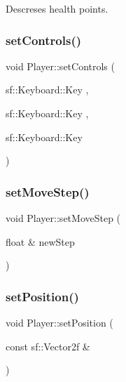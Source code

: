 Descreses health points. 

\mbox{\label{class_player_ab9820af1d231f97e0499b70ed6b34196}} 
\subsubsection{\texorpdfstring{setControls()}{setControls()}}
{\footnotesize\ttfamily void Player\+::set\+Controls (\begin{DoxyParamCaption}\item[{sf\+::\+Keyboard\+::\+Key}]{,  }\item[{sf\+::\+Keyboard\+::\+Key}]{,  }\item[{sf\+::\+Keyboard\+::\+Key}]{ }\end{DoxyParamCaption})}

\mbox{\label{class_player_a658ca673f68b8ba14f888b313f2f8fd3}} 
\subsubsection{\texorpdfstring{setMoveStep()}{setMoveStep()}}
{\footnotesize\ttfamily void Player\+::set\+Move\+Step (\begin{DoxyParamCaption}\item[{float \&}]{new\+Step }\end{DoxyParamCaption})\hspace{0.3cm}{\ttfamily [inline]}}

\mbox{\label{class_player_a9f37a6ecb0abbea3eed1348266135879}} 
\subsubsection{\texorpdfstring{setPosition()}{setPosition()}}
{\footnotesize\ttfamily void Player\+::set\+Position (\begin{DoxyParamCaption}\item[{const sf\+::\+Vector2f \&}]{ }\end{DoxyParamCaption})\hspace{0.3cm}{\ttfamily [virtual]}}



